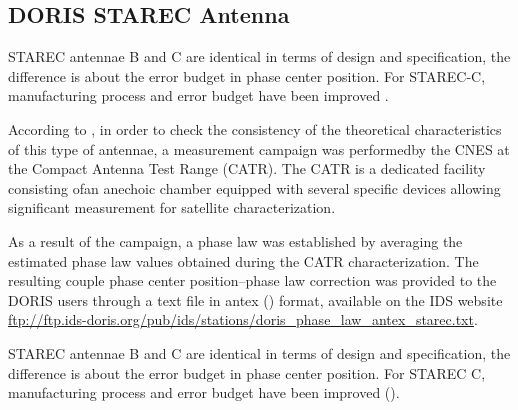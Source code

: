\subsection{DORIS STAREC Antenna}
STAREC antennae B and C are identical in terms of design and specification, the
difference is about the error budget in phase center position. For STAREC-C,
manufacturing process and error budget have been improved \cite{DORISGSM}.

According to \cite{TOURAIN2016}, in order to check the consistency of the theoretical 
characteristics of this type of antennae, a measurement campaign was performedby 
the CNES at the Compact Antenna Test Range (CATR). The CATR is a dedicated facility 
consisting ofan anechoic chamber equipped with several specific devices 
allowing significant measurement for satellite characterization.

As a result of the campaign, a phase law was established by averaging the estimated 
phase law values obtained during the CATR characterization. The resulting couple phase 
center position–phase law correction was provided to the  DORIS  users  through  a  
text  file  in  \gls{antex} (\cite{ANTEXv14}) format, available on the IDS website
\url{ftp://ftp.ids-doris.org/pub/ids/stations/doris_phase_law_antex_starec.txt}.

STAREC antennae B and C are identical in terms of design and specification, the
difference is about the error budget in phase center position. For STAREC C,
manufacturing process and error budget have been improved (\cite{DORISGSM}).

